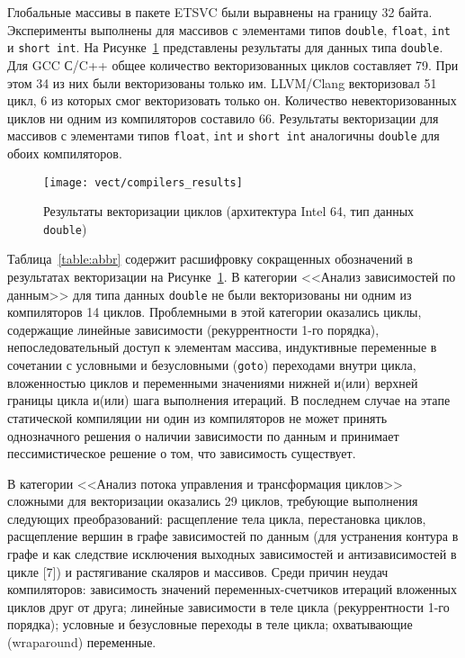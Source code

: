 Глобальные массивы в пакете ETSVC были выравнены на границу 32 байта. Эксперименты выполнены для массивов с элементами типов \texttt{double}, \texttt{float}, \texttt{int} и \texttt{short int}.
На Рисунке~\ref{img:vectorization-compilers-results} представлены результаты для данных типа \texttt{double}. Для GCC С/C++ общее количество векторизованных циклов составляет 79. При этом 34 из них были векторизованы только им. LLVM/Clang векторизовал 51 цикл, 6 из которых смог векторизовать только он. Количество невекторизованных циклов ни одним из компиляторов составило 66. Результаты векторизации для массивов с элементами типов \texttt{float}, \texttt{int} и \texttt{short int} аналогичны \texttt{double} для обоих компиляторов.

\begin{figure}[!h] 
  \centering
  \texttt{[image: vect/compilers\_results]}
  \caption{Результаты векторизации циклов (архитектура Intel 64, тип данных \texttt{double})}
  \label{img:vectorization-compilers-results}
\end{figure}

Таблица~\ref{table:abbr} содержит расшифровку сокращенных обозначений в результатах векторизации на Рисунке~\ref{img:vectorization-compilers-results}. В категории <<Анализ зависимостей по данным>> для типа данных \texttt{double} не были векторизованы ни одним из компиляторов 14 циклов. Проблемными в этой категории оказались циклы, содержащие линейные зависимости (рекуррентности 1-го порядка), непоследовательный доступ к элементам массива, индуктивные переменные в сочетании с условными и безусловными (\texttt{goto}) переходами внутри цикла, вложенностью циклов и переменными значениями нижней и(или) верхней границы цикла и(или) шага выполнения итераций. В последнем случае на этапе статической компиляции ни один из компиляторов не может принять однозначного решения о наличии зависимости по данным и принимает пессимистическое решение о том, что зависимость существует.

В категории <<Анализ потока управления и трансформация циклов>> сложными для векторизации оказались 29 циклов, требующие выполнения следующих преобразований: расщепление тела цикла, перестановка циклов, расщепление вершин в графе зависимостей по данным (для устранения контура в графе и как следствие исключения выходных зависимостей и антизависимостей в цикле [7]) и растягивание скаляров и массивов. Среди причин неудач компиляторов: зависимость значений переменных-счетчиков итераций вложенных циклов друг от друга; линейные зависимости в теле цикла (рекуррентности 1-го порядка); условные и безусловные переходы в теле цикла; охватывающие (wraparound) переменные.

